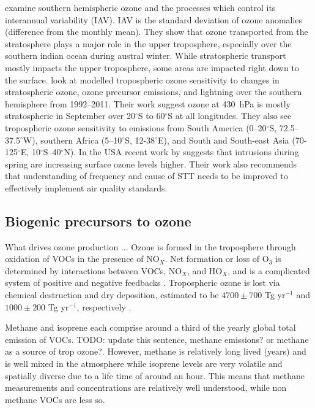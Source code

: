     \cite{Liu2017} examine southern hemispheric ozone and the processes which control its interannual variability (IAV).
    IAV is the standard deviation of ozone anomalies (difference from the monthly mean).
    They show that ozone transported from the stratosphere plays a major role in the upper troposphere, especially over the southern indian ocean during austral winter.
    While stratospheric transport mostly impacts the upper troposphere, some areas are impacted right down to the surface.
    \citet{Liu2017} look at modelled tropospheric ozone sensitivity to changes in stratospheric ozone, ozone precursor emissions, and lightning over the southern hemisphere from 1992--2011. 
    Their work suggest ozone at 430~hPa is mostly stratospheric in September over 20$^{\circ}$S to 60$^{\circ}$S at all longitudes.
    They also see tropospheric ozone sensitivity to emissions from South America (0--20$^{\circ}$S, 72.5--37.5$^{\circ}$W), southern Africa (5--10$^{\circ}$S, 12-38$^{\circ}$E), and South and South-east Asia (70-125$^{\circ}$E, 10$^{\circ}$S--40$^{\circ}$N).
    In the USA recent work by \cite{Lin2015} suggests that intrusions during spring are increasing surface ozone levels higher.
    Their work also recommends that understanding of frequency and cause of STT needs to be improved to effectively implement air quality standards.
    
  \subsection{Biogenic precursors to ozone}
    \label{LR:sec:BiogenicOzonePrecursors}
    What drives ozone production
    ...
    Ozone is formed in the troposphere through oxidation of VOCs in the presence of NO$_X$.
    Net formation or loss of O$_3$ is determined by interactions between VOCs, NO$_X$, and HO$_X$, and is a complicated system of positive and negative feedbacks \citep{Atkinson2000}.
    Tropospheric ozone is lost via chemical destruction and dry deposition, estimated to be $4700\pm700$ Tg yr$^{-1}$ and $1000\pm200$ Tg yr$^{-1}$, respectively \citep{Stevenson2006}.
    
    Methane and isoprene each comprise around a third of the yearly global total emission of VOCs. TODO: update this sentence, methane emissions? or methane as a source of trop ozone?.
    However, methane is relatively long lived (years) and is well mixed in the atmosphere while isoprene levels are very volatile and spatially diverse due to a life time of around an hour.
    This means that methane measurements and concentrations are relatively well understood, while non methane VOCs are less so.
    
